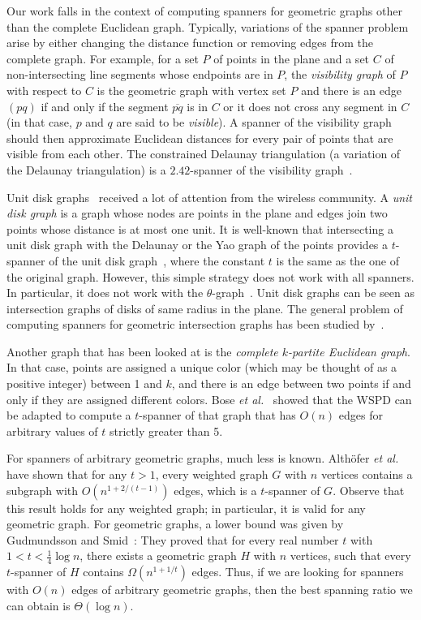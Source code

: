 \documentclass[pdftex,leqno,fleqn,12pt]{article}
\newcommand{\etal}{\textit{et al.}}
\begin{document}
Our work falls in the context of computing spanners for geometric graphs other than the complete
Euclidean graph. Typically, variations of the spanner problem arise by either changing the distance
function or removing edges from the complete graph. For example, for a set $P$ of points in the
plane and a set $C$ of non-intersecting line segments whose endpoints are in $P$, the
\emph{visibility graph} of $P$ with respect to $C$ is the geometric graph with vertex set $P$ and
there is an edge $(pq)$ if and only if the segment $\overline{pq}$ is in $C$ or it does not cross
any segment in $C$ (in that case, $p$ and $q$ are said to be \emph{visible}). A spanner of the
visibility graph should then approximate Euclidean distances for every pair of points that are
visible from each other. The constrained Delaunay triangulation (a variation of the Delaunay
triangulation) is a $2.42$-spanner of the visibility graph~\cite{ioannis01, klein06, bose06}.

Unit disk graphs~\cite{hale80,johnson90} received a lot of attention from the wireless community. A
\emph{unit disk graph} is a graph whose nodes are points in the plane and edges join two points
whose distance is at most one unit. It is well-known that intersecting a unit disk graph with the
Delaunay or the Yao graph of the points provides a $t$-spanner of the unit disk
graph~\cite{bose04}, where the constant $t$ is the same as the one of the original graph. However,
this simple strategy does not work with all spanners. In particular, it does not work with the
$\theta$-graph~\cite{couture07c}. Unit disk graphs can be seen as intersection graphs of disks of
same radius in the plane. The general problem of computing spanners for geometric intersection
graphs has been studied by~\citet{furer07}.

Another graph that has been looked at is the \emph{complete $k$-partite Euclidean graph}. In that
case, points are assigned a unique color (which may be thought of as a positive integer) between 1
and $k$, and there is an edge between two points if and only if they are assigned different colors.
Bose \etal~\cite{couture07bispanReport} showed that the WSPD can be adapted to compute a
$t$-spanner of that graph that has $O(n)$ edges for arbitrary values of $t$ strictly greater than
5.

For spanners of arbitrary geometric graphs, much less is known. Alth{\"o}fer \emph{et
al.}~\cite{addjs-sswg-93} have shown that for any $t>1$, every weighted graph $G$ with $n$ vertices
contains a subgraph with $O(n^{1+2/(t-1)})$ edges, which is a $t$-spanner of $G$. Observe that this
result holds for any weighted graph; in particular, it is valid for any geometric graph. For
geometric graphs, a lower bound was given by Gudmundsson and Smid~\cite{gs-osogg-06}: They proved
that for every real number $t$ with $1 < t < \frac{1}{4} \log n$, there exists a geometric graph
$H$ with $n$ vertices, such that every $t$-spanner of $H$ contains $\Omega( n^{1 + 1/t} )$ edges.
Thus, if we are looking for spanners with $O(n)$ edges of arbitrary geometric graphs, then the best
spanning ratio we can obtain is $\Theta(\log n)$.
\end{document}
